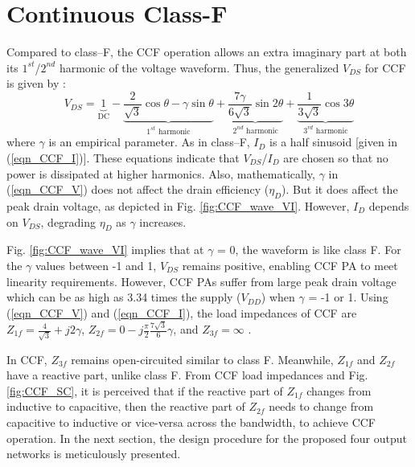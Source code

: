 \documentclass[conference]{IEEEtran}
\begin{document}

\section{Continuous Class-F}
\label{section:CCF}
\vspace{-0.05in}
Compared to class--F, the CCF operation allows an extra imaginary part at both its $1^{st}$/$2^{nd}$ harmonic of the voltage waveform. Thus, the generalized $V_{DS}$ for CCF is given by \cite{ECCF_Carrubba}:
\begin{equation}
V_{DS}=\underbrace{1}_{\text{DC}}-\underbrace{\frac{2}{\sqrt{3}} \cos \theta-\gamma \sin \theta}_{\text{$1^{st}$ harmonic}}+\underbrace{\frac{7 \gamma}{6 \sqrt{3}} \sin 2 \theta}_{\text{$2^{nd}$ harmonic}}+\underbrace{\frac{1}{3 \sqrt{3}} \cos 3 \theta}_{\text{$3^{rd}$ harmonic}}
\label{eqn_CCF_V}
\end{equation}
where $\gamma$ is an empirical parameter. As in class--F, $I_{D}$ is a half sinusoid [given in (\ref{eqn_CCF_I})]. These equations indicate that $V_{DS}$/$I_{D}$ are chosen so that no power is dissipated at higher harmonics. Also, mathematically, $\gamma$ in (\ref{eqn_CCF_V}) does not affect the drain efficiency ($\eta_D$). But it does affect the peak drain voltage, as depicted in Fig. \ref{fig:CCF_wave_VI}. However, $I_{D}$ depends on $V_{DS}$, degrading $\eta_D$ as $\gamma$ increases.


Fig. \ref{fig:CCF_wave_VI} implies that at $\gamma$ = 0, the waveform is like class F. For the $\gamma$ values between -1 and 1, $V_{DS}$ remains positive, enabling CCF PA to meet linearity requirements. However, CCF PAs suffer from large peak drain voltage which can be as high as 3.34 times the supply ($V_{DD}$) when $\gamma$ = -1 or 1. Using (\ref{eqn_CCF_V}) and (\ref{eqn_CCF_I}), the load impedances of CCF  are $Z_{1f}=\frac{4}{\sqrt{3}}+j 2 \gamma$, $Z_{2f}=0-j \frac{\pi}{2} \frac{7 \sqrt{3}}{6} \gamma$, and $Z_{3f}=\infty$ \cite{CCFDesign_ali}.


In CCF, $Z_{3f}$ remains open-circuited similar to class F. Meanwhile, $Z_{1f}$ and $Z_{2f}$ have a reactive part, unlike class F. From CCF load impedances and Fig. \ref{fig:CCF_SC}, it is perceived that if the reactive part of $Z_{1f}$ changes from inductive to capacitive, then the reactive part of $Z_{2f}$  needs to change from capacitive to inductive or vice-versa across the bandwidth, to achieve CCF operation. In the next section, the design procedure for the proposed four output networks is meticulously presented. 
\end{document}

